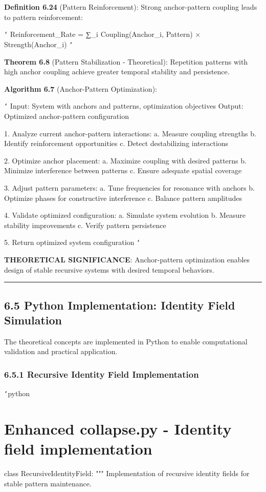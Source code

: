 \textbf{Definition 6.24} (Pattern Reinforcement): Strong anchor-pattern coupling leads to pattern reinforcement:

\texttt{`}
Reinforcement_Rate = ∑_i Coupling(Anchor_i, Pattern) × Strength(Anchor_i)
\texttt{`}

\textbf{Theorem 6.8} (Pattern Stabilization - Theoretical): Repetition patterns with high anchor coupling achieve greater temporal stability and persistence.

\textbf{Algorithm 6.7} (Anchor-Pattern Optimization):

\texttt{`}
Input: System with anchors and patterns, optimization objectives
Output: Optimized anchor-pattern configuration

1. Analyze current anchor-pattern interactions:
   a. Measure coupling strengths
   b. Identify reinforcement opportunities
   c. Detect destabilizing interactions
   
2. Optimize anchor placement:
   a. Maximize coupling with desired patterns
   b. Minimize interference between patterns
   c. Ensure adequate spatial coverage
   
3. Adjust pattern parameters:
   a. Tune frequencies for resonance with anchors
   b. Optimize phases for constructive interference
   c. Balance pattern amplitudes
   
4. Validate optimized configuration:
   a. Simulate system evolution
   b. Measure stability improvements
   c. Verify pattern persistence
   
5. Return optimized system configuration
\texttt{`}

\textbf{THEORETICAL SIGNIFICANCE}: Anchor-pattern optimization enables design of stable recursive systems with desired temporal behaviors.

\hrule

\section{6.5 Python Implementation: Identity Field Simulation}

The theoretical concepts are implemented in Python to enable computational validation and practical application.

\subsection{6.5.1 Recursive Identity Field Implementation}

\texttt{`}python
\chapter{Enhanced collapse.py - Identity field implementation}
class RecursiveIdentityField:
    """
    Implementation of recursive identity fields for stable pattern maintenance.
    
